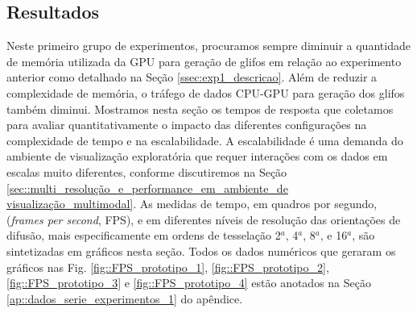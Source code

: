 
 
\subsection{Resultados}



Neste primeiro grupo de experimentos, procuramos sempre diminuir a quantidade de memória utilizada da GPU para geração de glifos em relação ao experimento anterior como detalhado na Seção \ref{ssec:exp1_descricao}. Além de reduzir a complexidade de memória, o tráfego de dados CPU-GPU para geração dos glifos também diminui. Mostramos nesta seção os tempos de resposta que coletamos para avaliar quantitativamente o impacto das diferentes configurações na complexidade de tempo e na escalabilidade. A escalabilidade é uma demanda do ambiente de visualização exploratória que requer interações com os dados em escalas muito diferentes, conforme discutiremos na Seção \ref{sec::multi_resolução_e_performance_em_ambiente_de visualização_multimodal}. As medidas de tempo, em quadros por segundo, (\textit{frames per second}, FPS), e em diferentes níveis de resolução das orientações de difusão, mais especificamente em ordens de tesselação 2$^a$, 4$^a$, 8$^a$, e 16$^a$, são sintetizadas em gráficos nesta seção.
Todos os dados numéricos que geraram os gráficos nas Fig. \ref{fig::FPS_prototipo_1}, \ref{fig::FPS_prototipo_2}, \ref{fig::FPS_prototipo_3} e \ref{fig::FPS_prototipo_4} estão anotados na Seção \ref{ap::dados_serie_experimentos_1} do apêndice.

